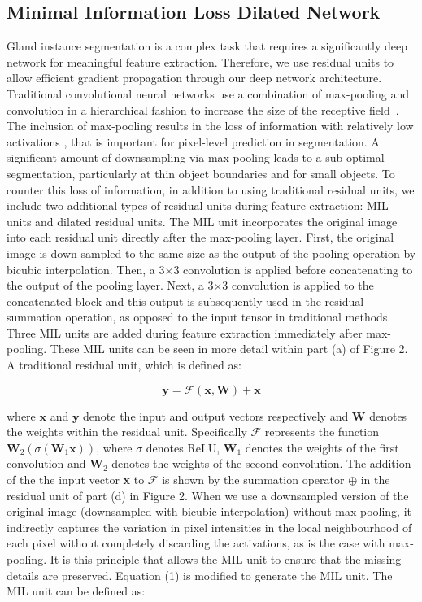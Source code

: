 \documentclass[3p]{elsarticle}
\begin{document}
\subsection{Minimal Information Loss Dilated Network}
Gland instance segmentation is a complex task that requires a significantly deep network for meaningful feature extraction. Therefore, we use residual units to allow efficient gradient propagation through our deep network architecture. Traditional convolutional neural networks use a combination of max-pooling and convolution in a hierarchical fashion to increase the size of the receptive field~\citep{lecun2015deep}. The inclusion of max-pooling results in the loss of information with relatively low activations \citep{sabour2017dynamic}, that is important for pixel-level prediction in segmentation. A significant amount of downsampling via max-pooling leads to a sub-optimal segmentation, particularly at thin object boundaries and for small objects. To counter this loss of information, in addition to using traditional residual units,  we include two additional types of residual units during feature extraction: MIL units and dilated residual units. The MIL unit incorporates the original image into each residual unit directly after the max-pooling layer. First, the original image is down-sampled to the same size as the output of the pooling operation by bicubic interpolation. Then, a 3$\times$3 convolution is applied before concatenating to the output of the pooling layer. Next, a 3$\times$3 convolution is applied to the concatenated block and this output is subsequently used in the residual summation operation, as opposed to the input tensor in traditional methods. Three MIL units are added during feature extraction immediately after max-pooling. These MIL units can be seen in more detail within part (a) of Figure 2. A traditional residual unit, which is defined as:

\begin{equation}
\textbf{y} = \mathcal{F}(\textbf{x} , {\textbf{W}}) + \textbf{x}
\end{equation}

\noindent where $\textbf{x}$ and $\textbf{y}$ denote the input and output vectors respectively and $\textbf{W}$ denotes the weights within the residual unit. Specifically $\mathcal{F}$ represents the function $\textbf{W}_2(\sigma(\textbf{W}_1\textbf{x}))$, where $\sigma$ denotes ReLU, $\textbf{W}_1$ denotes the weights of the first convolution and $\textbf{W}_2$ denotes the weights of the second convolution. The addition of the the input vector \textbf{x} to $\mathcal{F}$ is shown by the summation operator $\oplus$ in the residual unit of part (d) in Figure 2. When we use a downsampled version of the original image (downsampled with bicubic interpolation) without max-pooling, it indirectly captures the variation in pixel intensities in the local neighbourhood of each pixel without completely discarding the activations, as is the case with max-pooling. It is this principle that allows the MIL unit to ensure that the missing details are preserved. Equation (1) is modified to generate the MIL unit. The MIL unit can be defined as:
\end{document}
